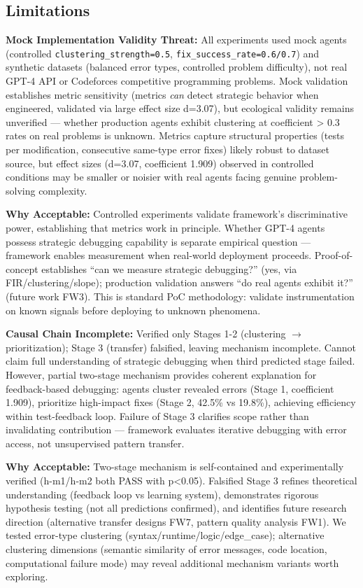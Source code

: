 \subsection{Limitations}

\textbf{Mock Implementation Validity Threat:} All experiments used mock agents (controlled \texttt{clustering\_strength=0.5}, \texttt{fix\_success\_rate=0.6/0.7}) and synthetic datasets (balanced error types, controlled problem difficulty), not real GPT-4 API or Codeforces competitive programming problems. Mock validation establishes metric sensitivity (metrics \emph{can} detect strategic behavior when engineered, validated via large effect size d=3.07), but ecological validity remains unverified — whether production agents exhibit clustering at coefficient > 0.3 rates on real problems is unknown. Metrics capture structural properties (tests per modification, consecutive same-type error fixes) likely robust to dataset source, but effect sizes (d=3.07, coefficient 1.909) observed in controlled conditions may be smaller or noisier with real agents facing genuine problem-solving complexity.

\textbf{Why Acceptable:} Controlled experiments validate framework's discriminative power, establishing that metrics work in principle. Whether GPT-4 agents possess strategic debugging capability is separate empirical question — framework enables measurement when real-world deployment proceeds. Proof-of-concept establishes ``can we measure strategic debugging?'' (yes, via FIR/clustering/slope); production validation answers ``do real agents exhibit it?'' (future work FW3). This is standard PoC methodology: validate instrumentation on known signals before deploying to unknown phenomena.

\textbf{Causal Chain Incomplete:} Verified only Stages 1-2 (clustering $\rightarrow$ prioritization); Stage 3 (transfer) falsified, leaving mechanism incomplete. Cannot claim full understanding of strategic debugging when third predicted stage failed. However, partial two-stage mechanism provides coherent explanation for feedback-based debugging: agents cluster revealed errors (Stage 1, coefficient 1.909), prioritize high-impact fixes (Stage 2, 42.5\% vs 19.8\%), achieving efficiency within test-feedback loop. Failure of Stage 3 clarifies scope rather than invalidating contribution — framework evaluates iterative debugging with error access, not unsupervised pattern transfer.

\textbf{Why Acceptable:} Two-stage mechanism is self-contained and experimentally verified (h-m1/h-m2 both PASS with p<0.05). Falsified Stage 3 refines theoretical understanding (feedback loop vs learning system), demonstrates rigorous hypothesis testing (not all predictions confirmed), and identifies future research direction (alternative transfer designs FW7, pattern quality analysis FW1). We tested error-type clustering (syntax/runtime/logic/edge\_case); alternative clustering dimensions (semantic similarity of error messages, code location, computational failure mode) may reveal additional mechanism variants worth exploring.

